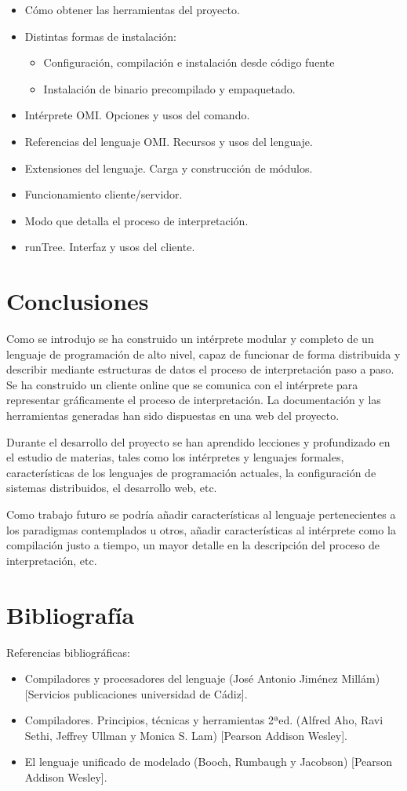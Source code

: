 \begin {itemize}
\item Cómo obtener las herramientas del proyecto.
\item Distintas formas de instalación:
\begin{itemize}
   \item Configuración, compilación e instalación desde código fuente
   \item Instalación de binario precompilado y empaquetado. 
\end{itemize}
 \item Intérprete OMI. Opciones y usos del comando. 
 \item Referencias del lenguaje OMI. Recursos y usos del lenguaje. 
 \item Extensiones del lenguaje. Carga y construcción de módulos.
 \item Funcionamiento cliente/servidor.
 \item Modo que detalla el proceso de interpretación.
 \item runTree. Interfaz y usos del cliente.
\end{itemize}

\section{Conclusiones}
Como se introdujo se ha construido un intérprete modular y completo de un lenguaje de programación de alto nivel, capaz de funcionar de forma distribuida y 
describir mediante estructuras de datos el proceso de interpretación paso a paso. Se ha construido un cliente online que se comunica con el intérprete para 
representar gráficamente el proceso de interpretación. La documentación y las herramientas generadas han sido dispuestas en una web del proyecto. 

Durante el desarrollo del proyecto se han aprendido lecciones y profundizado en el estudio de materias, tales como los intérpretes y lenguajes formales, características 
de los lenguajes de programación actuales, la configuración de sistemas distribuidos, el desarrollo web, etc.

Como trabajo futuro se podría añadir características al lenguaje pertenecientes a los paradigmas contemplados u otros, añadir características al intérprete como la compilación justo a tiempo, 
un mayor detalle en la descripción del proceso de interpretación, etc.

\section{Bibliografía}
Referencias bibliográficas:
\begin{itemize}
\item Compiladores y procesadores del lenguaje (José Antonio Jiménez Millám) [Servicios publicaciones universidad de Cádiz].
\item Compiladores. Principios, técnicas y herramientas 2ªed. (Alfred Aho, Ravi Sethi, Jeffrey Ullman y Monica S. Lam) [Pearson Addison Wesley].
\item El lenguaje unificado de modelado (Booch, Rumbaugh y Jacobson) [Pearson Addison Wesley].
\end{itemize}


